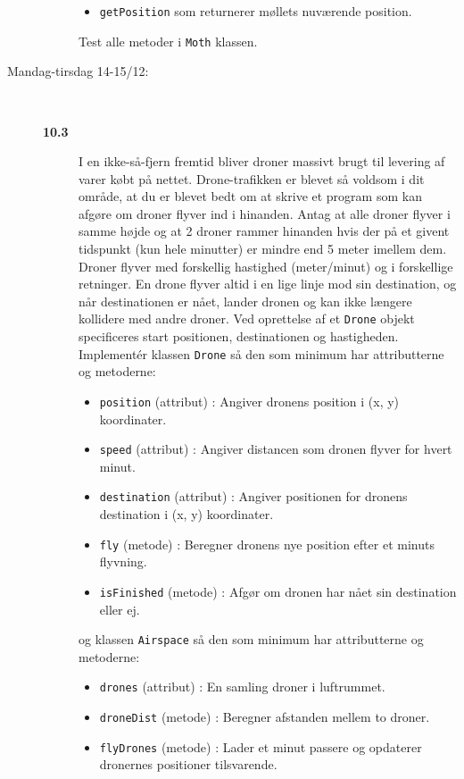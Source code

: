 \documentclass[a4paper,12pt]{article}
\begin{document}
\begin{description}
\begin{description}
\begin{itemize}
\item \texttt{getPosition} som returnerer møllets nuværende position.
\end{itemize}
Test alle metoder i \texttt{Moth} klassen.
\end{description}
\item[Mandag-tirsdag 14-15/12:]~\\[-8mm]
  \begin{description}
  \item[\textbf{10.3}] I en ikke-så-fjern fremtid bliver droner massivt brugt til levering af varer købt på nettet.  Drone-trafikken er blevet så voldsom i dit område, at du er blevet bedt om at skrive et program som kan afgøre om droner flyver ind i hinanden. Antag at alle droner flyver i samme højde og at 2 droner rammer hinanden hvis der på et givent tidspunkt (kun hele minutter) er mindre end 5 meter imellem dem.  Droner flyver med forskellig hastighed (meter/minut) og i forskellige retninger. En drone flyver altid i en lige linje mod sin destination, og når destinationen er nået, lander dronen og kan ikke længere kollidere med andre droner.  Ved oprettelse af et \texttt{Drone} objekt specificeres start positionen, destinationen og hastigheden.  Implementér klassen \texttt{Drone} så den som minimum har attributterne og metoderne:
    \begin{itemize}
    \item \texttt{position} (attribut) : Angiver dronens position i (x, y) koordinater.
    \item \texttt{speed} (attribut) : Angiver distancen som dronen flyver for hvert minut.
    \item \texttt{destination} (attribut) : Angiver positionen for dronens destination i (x, y) koordinater.
    \item \texttt{fly} (metode) : Beregner dronens nye position efter et minuts flyvning.
    \item \texttt{isFinished} (metode) : Afgør om dronen har nået sin destination eller ej.
    \end{itemize}
    og klassen \texttt{Airspace} så den som minimum har attributterne og metoderne:
    \begin{itemize}
    \item \texttt{drones} (attribut) : En samling droner i luftrummet.
    \item \texttt{droneDist} (metode) : Beregner afstanden mellem to droner.
    \item \texttt{flyDrones} (metode) : Lader et minut passere og opdaterer dronernes positioner tilsvarende.

\end{itemize}
\end{description}
\end{description}
\end{document}
